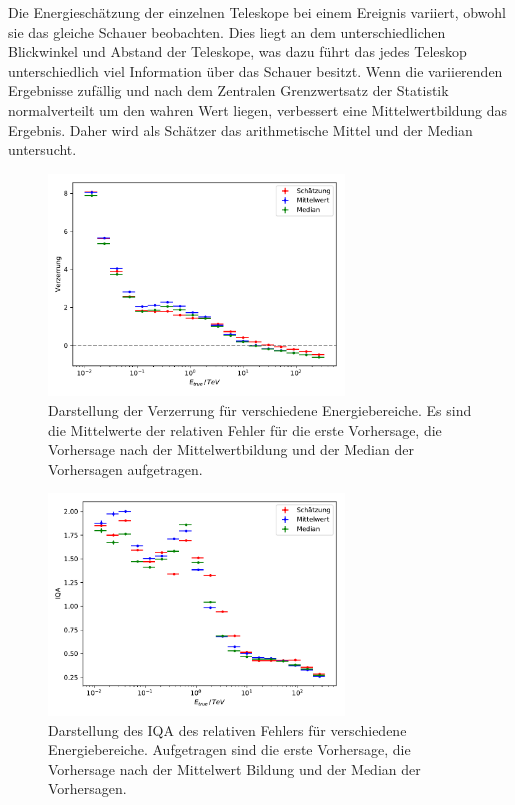 Die Energieschätzung der einzelnen Teleskope bei einem Ereignis variiert, obwohl sie das gleiche Schauer beobachten.
Dies liegt an dem unterschiedlichen Blickwinkel und Abstand der Teleskope, was dazu führt das jedes Teleskop unterschiedlich viel Information über das
Schauer besitzt.
Wenn die variierenden Ergebnisse zufällig und nach dem Zentralen Grenzwertsatz der Statistik normalverteilt um den
wahren Wert liegen\cite[10]{zufall_Fehler}, verbessert eine Mittelwertbildung das Ergebnis.
Daher wird als Schätzer das arithmetische Mittel und der Median untersucht.
\begin{figure}
  \includegraphics[width=0.7\textwidth]{Plots/RF_mean_bias.pdf}
  \centering
  \caption{Darstellung der Verzerrung für verschiedene Energiebereiche. Es sind die Mittelwerte der relativen Fehler für die erste Vorhersage, die Vorhersage
          nach der Mittelwertbildung und der Median der Vorhersagen aufgetragen.}
  \label{abb:mean_median_bias}
\end{figure}
\begin{figure}
  \includegraphics[width=0.7\textwidth]{Plots/RF_mean_resolution.pdf}
  \centering
  \caption{Darstellung des IQA des relativen Fehlers für verschiedene Energiebereiche. Aufgetragen sind die erste Vorhersage, die Vorhersage
          nach der Mittelwert Bildung und der Median der Vorhersagen.}
  \label{abb:mean_median_IQA}
\end{figure}

